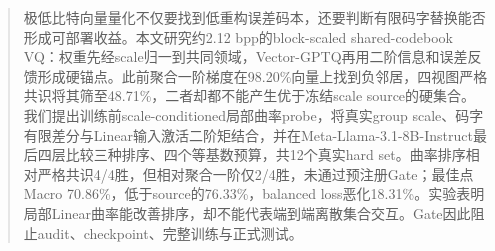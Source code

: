 \begin{abstract}
极低比特向量量化不仅要找到低重构误差码本，还要判断有限码字替换能否形成可部署收益。本文研究约2.12 bpp的block-scaled shared-codebook VQ：权重先经scale归一到共同领域，Vector-GPTQ再用二阶信息和误差反馈形成硬锚点。此前聚合一阶梯度在98.20\%向量上找到负邻居，四视图严格共识将其筛至48.71\%，二者却都不能产生优于冻结scale source的硬集合。我们提出训练前scale-conditioned局部曲率probe，将真实group scale、码字有限差分与Linear输入激活二阶矩结合，并在Meta-Llama-3.1-8B-Instruct最后四层比较三种排序、四个等基数预算，共12个真实hard set。曲率排序相对严格共识4/4胜，但相对聚合一阶仅2/4胜，未通过预注册Gate；最佳点Macro 70.86\%，低于source的76.33\%，balanced loss恶化18.31\%。实验表明局部Linear曲率能改善排序，却不能代表端到端离散集合交互。Gate因此阻止audit、checkpoint、完整训练与正式测试。
\end{abstract}
